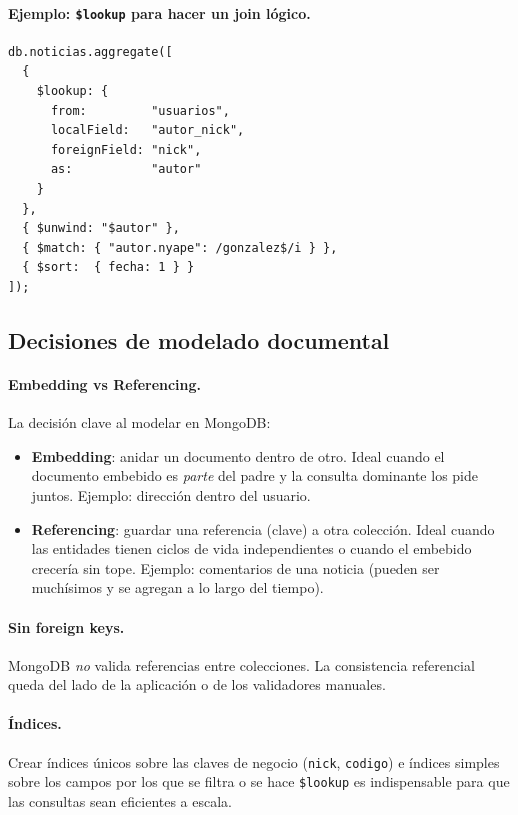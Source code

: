 \documentclass[11pt,a4paper]{article}
\begin{document}
\paragraph{Ejemplo: \texttt{\$lookup} para hacer un join lógico.}

\begin{lstlisting}
db.noticias.aggregate([
  {
    $lookup: {
      from:         "usuarios",
      localField:   "autor_nick",
      foreignField: "nick",
      as:           "autor"
    }
  },
  { $unwind: "$autor" },
  { $match: { "autor.nyape": /gonzalez$/i } },
  { $sort:  { fecha: 1 } }
]);
\end{lstlisting}

\subsection{Decisiones de modelado documental}

\paragraph{Embedding vs Referencing.} La decisión clave al modelar en
MongoDB:

\begin{itemize}
    \item \textbf{Embedding}: anidar un documento dentro de otro. Ideal
    cuando el documento embebido es \emph{parte} del padre y la
    consulta dominante los pide juntos. Ejemplo: dirección dentro del
    usuario.
    \item \textbf{Referencing}: guardar una referencia (clave) a otra
    colección. Ideal cuando las entidades tienen ciclos de vida
    independientes o cuando el embebido crecería sin tope. Ejemplo:
    comentarios de una noticia (pueden ser muchísimos y se agregan a lo
    largo del tiempo).
\end{itemize}

\paragraph{Sin foreign keys.} MongoDB \emph{no} valida referencias entre
colecciones. La consistencia referencial queda del lado de la
aplicación o de los validadores manuales.

\paragraph{Índices.} Crear índices únicos sobre las claves de negocio
(\texttt{nick}, \texttt{codigo}) e índices simples sobre los campos por
los que se filtra o se hace \texttt{\$lookup} es indispensable para que
las consultas sean eficientes a escala.
\end{document}
